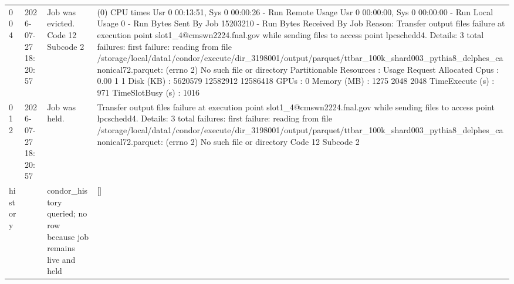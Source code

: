 \begin{tabular}{llll}
004 & 2026-07-27 18:20:57 & Job was evicted. Code 12 Subcode 2 & (0) CPU times Usr 0 00:13:51, Sys 0 00:00:26  -  Run Remote Usage Usr 0 00:00:00, Sys 0 00:00:00  -  Run Local Usage 0  -  Run Bytes Sent By Job 15203210  -  Run Bytes Received By Job Reason: Transfer output files failure at execution point slot1\_4@cmswn2224.fnal.gov while sending files to access point lpcschedd4. Details: 3 total failures: first failure: reading from file /storage/local/data1/condor/execute/dir\_3198001/output/parquet/ttbar\_100k\_shard003\_pythia8\_delphes\_canonical72.parquet: (errno 2) No such file or directory Partitionable Resources :      Usage  Request Allocated Cpus                 :       0.00        1         1 Disk (KB)            : 5620579    12582912  12586418 GPUs                 :                             0 Memory (MB)          :    1275        2048      2048 TimeExecute (s)      :     971 TimeSlotBusy (s)     :    1016 \\
012 & 2026-07-27 18:20:57 & Job was held. & Transfer output files failure at execution point slot1\_4@cmswn2224.fnal.gov while sending files to access point lpcschedd4. Details: 3 total failures: first failure: reading from file /storage/local/data1/condor/execute/dir\_3198001/output/parquet/ttbar\_100k\_shard003\_pythia8\_delphes\_canonical72.parquet: (errno 2) No such file or directory Code 12 Subcode 2 \\
history &  & condor\_history queried; no row because job remains live and held & [] \\
\bottomrule
\end{tabular}
